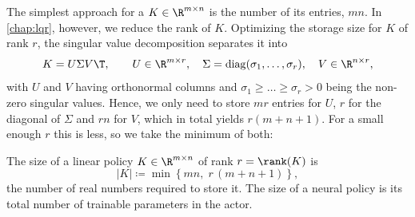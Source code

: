 The simplest approach for a $K \in \R^{m \times n}$ is the number of its entries,
$m n$. In \cref{chap:lqr}, however, we reduce the rank of $K$.
Optimizing the storage size for $K$ of rank $r$, the singular value decomposition
 separates it into
\begin{equation}
    \label{eq:svd}
    K = U \Sigma V\T ,
    \qquad
    U \in \R^{m \times r}, \quad
    \Sigma = \operatorname{diag}(\sigma_1, \dots, \sigma_r), \quad
    V \in \R^{n \times r} ,
\end{equation}
with $U$ and $V$ having orthonormal columns and $\sigma_1 \geq \dots \geq
\sigma_r > 0$ being the non-zero singular values. Hence, we only need to
store $mr$ entries for $U$, $r$ for the diagonal of $\Sigma$ and
$rn$ for $V$, which in total yields $r(m + n + 1)$. 
For a small enough $r$ this is less, so we take the minimum of both:

\begin{definition}
\label{def:policy-size}
The size of a linear policy $K \in \R^{m \times n}$ of rank
$r = \rank(K)$ is
\begin{equation*}
    \lvert K \rvert \coloneqq \min \left\{ m n, \; r \, (m + n + 1) \right\} ,
\end{equation*}
the number of real numbers required to store it.
The size of a neural policy is its total number of trainable parameters in the
actor.
\end{definition}